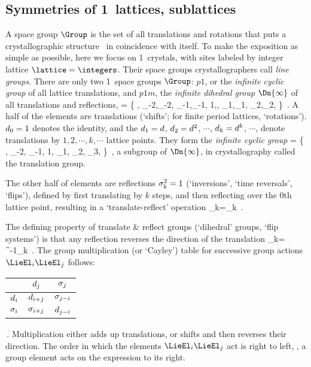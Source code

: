 \subsection{Symmetries of 1\dmn\ lattices, sublattices}
\label{s:1dLatt}

A space group $\Group$ is the set of all translations and rotations that
puts a crystallographic structure \lattice\ in coincidence with itself.
To make the exposition as simple as possible, here we focus on 1\dmn\
crystals, with sites labeled by integer lattice $ \lattice=\integers$.
Their space groups crystallographers\rf{Dresselhaus07} call \emph{line
groups}.
%
There are only two 
{1\dmn\ space groups}  $\Group$: $p1$, or the \emph{infinite cyclic
group}  \Cn{\infty} of all lattice translations,
and
$p1m$, the \emph{infinite dihedral group} $\Dn{\infty}$  of all
translations and reflections,
\beq
  \Dn{\infty} = \{
\cdots, \shift_{-2},\Refl_{-2}, \shift_{-1},\Refl_{-1},
        1,\Refl,
        \shift_{1},\Refl_{1}, \shift_{2},\Refl_{2}, \cdots
             \}
\,.
A half of the elements are translations (`shifts'; for finite period
lattices, `rotations').
$d_{0}=1$ denotes the identity,
and
the
$d_{1}=d$, $d_{2}=d^2$, $\cdots$,
$d_{k}=d^k$, $\cdots$,
denote translations by $1,2,\cdots,k,\cdots$ lattice points. They form
the \emph{infinite cyclic group}
\beq
\Cn{\infty}
    =       \{
\cdots, \shift_{-2}, \shift_{-1},
        1,
        \shift_{1}, \shift_{2}, \shift_{3}, \cdots
             \}
\,,
\label{C_infty}
\eeq
a subgroup of $\Dn{\infty}$,
in crystallography called the translation group.

The other half of elements are reflections $\sigma_{k}^2=1$
(`inversions', `time reversals', `flips'), defined by first translating
by $k$ steps, and then reflecting over the 0th lattice point, 
resulting in a `translate-reflect' operation
\beq
\Refl_{k}=\Refl\shift_k
\,.

The defining property of translate \& reflect groups
(`dihedral' groups, `flip systems') is that
any reflection reverses the direction of the translation
\beq
\Refl_{k}\shift = \shift^{-1}\Refl_{k}
\,.
%
The group multiplication (or `Cayley') table for successive group actions
$\LieEl_i\LieEl_j$ follows:
\beq
\begin{tabular}{c|cc}
            &$d_j$        &$\sigma_j$\\\hline
$d_i$  &$d_{i+j}$     &$\sigma_{j-i}$\\
$\sigma_i$   &$\sigma_{i+j}$     &$d_{j-i}$
\end{tabular}
\,.
Multiplication either adds up translations,
or shifts and then reverses their direction.
The order in which the elements $\LieEl_i\LieEl_j$ act is right to left,
\ie, a group element acts on the expression to its right.

